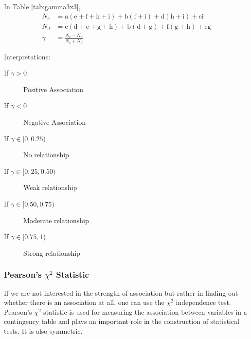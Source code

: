\documentclass[
10pt, %
a4paper, %
]{report}
\begin{document}
In Table \ref{tab:gamma3x3},
\begin{align*}
N_c &= \mathrm{a}(\mathrm{e}+\mathrm{f}+\mathrm{h}+\mathrm{i}) + \mathrm{b}(\mathrm{f}+\mathrm{i}) + \mathrm{d}(\mathrm{h}+\mathrm{i}) + \mathrm{ei} \\
N_d &= \mathrm{c}(\mathrm{d}+\mathrm{e}+\mathrm{g}+\mathrm{h}) + \mathrm{b}(\mathrm{d}+\mathrm{g}) + \mathrm{f}(\mathrm{g}+\mathrm{h}) + \mathrm{eg} \\
\gamma &= \frac{N_c - N_d}{N_c + N_d}
\end{align*}

Interpretations:
\begin{description}
\item[If \(\gamma > 0\)] \item[] Positive Association
\item[If \(\gamma < 0\)] \item[] Negative Association
\item[If \(\gamma \in [0, 0.25)\)] \item[] No relationship
\item[If \(\gamma \in [0,25, 0.50)\)] \item[] Weak relationship
\item[If \(\gamma \in [0.50, 0.75)\)] \item[] Moderate relationship
\item[If \(\gamma \in [0.75, 1)\)] \item[] Strong relationship
\end{description}

\subsubsection{Pearson's \(\chi^2\) Statistic}

If we are not interested in the strength of association but rather in finding out whether there is an association at all, one can use the \(\chi^2\) independence test. Pearson’s \(\chi^2\) statistic is used for measuring the association between variables in a contingency table and plays an important role in the construction of statistical tests. It is also symmetric.
\end{document}
